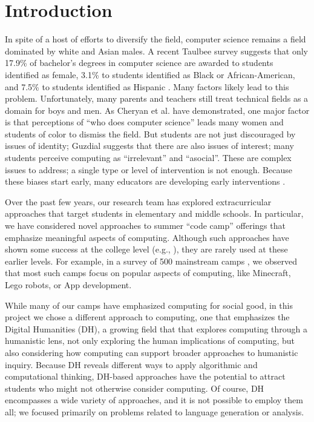\section{Introduction}

In spite of a host of efforts to diversify the field, computer
science remains a field dominated by white and Asian males.  A
recent Taulbee survey suggests that only 17.9\%
of bachelor's degrees in computer science are awarded to students
identified as female, 3.1\% to students identified as Black or
African-American, and 7.5\% to students identified as Hispanic
\cite{Taulbee2016}.  Many factors likely lead to this
problem.  Unfortunately, many parents and teachers still treat
technical fields as a domain for boys and men.  As Cheryan et al.
\cite{Cheryan2010} have demonstrated, one major factor is that
perceptions of ``who does computer science'' leads many women and
students of color to dismiss the field.  But students are not
just discouraged by issues of identity; Guzdial \cite{Guzdial2009}
suggests that there are also issues of interest; many students
perceive computing as ``irrelevant'' and ``asocial''.
These are complex issues to address; a single type or level of
intervention is not enough.  Because these biases start early,
many educators are developing early interventions
\cite{McGill2015,Decker2016}.  

Over the past few years, our research team has explored extracurricular
approaches that target students in elementary and middle schools.
In particular, we have considered novel approaches to summer ``code
camp'' offerings that emphasize meaningful aspects of computing.
Although such approaches have shown some success at the college
level (e.g., \cite{Goldweber2013, Goldweber2018, Wolz2011}), they are rarely
used at these earlier levels.  For example, in a survey of 500
mainstream camps \cite{DeWitt2017}, we observed that most such camps
focus on popular aspects of computing, like Minecraft, Lego robots,
or App development.

While many of our camps have emphasized computing for social good,
in this project we chose a different approach to computing, one
that emphasizes the Digital Humanities (DH), a growing field that
that explores computing through a humanistic lens, not only exploring
the human implications of computing, but also considering how
computing can support broader approaches to humanistic inquiry.
Because DH reveals different ways to apply algorithmic and computational
thinking, DH-based approaches have the potential to attract students
who might not otherwise consider computing.  Of course, DH encompasses
a wide variety of approaches, and it is not possible to employ them
all; we focused primarily on problems related to language generation
or analysis.

